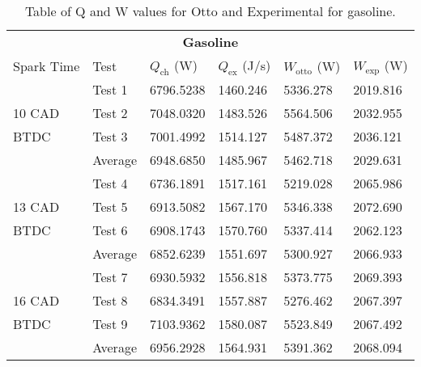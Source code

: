 \begin{table}[H]
    \begin{center}
        \begin{tabular}{@{}l l l l l l@{}}
            \toprule
            \multicolumn{6}{c}{\textbf{Gasoline}}                                                                             \\
            Spark Time & Test    & $Q_\textrm{ch}$ (W) & $Q_\textrm{ex}$ (J/s) & $W_\textrm{otto}$ (W) & $W_\textrm{exp}$ (W) \\
            \midrule
                       & Test 1  & 6796.5238           & 1460.246              & 5336.278              & 2019.816             \\
            10 CAD     & Test 2  & 7048.0320           & 1483.526              & 5564.506              & 2032.955             \\
            BTDC       & Test 3  & 7001.4992           & 1514.127              & 5487.372              & 2036.121             \\
                       & Average & 6948.6850           & 1485.967              & 5462.718              & 2029.631             \\
                       & Test 4  & 6736.1891           & 1517.161              & 5219.028              & 2065.986             \\
            13 CAD     & Test 5  & 6913.5082           & 1567.170              & 5346.338              & 2072.690             \\
            BTDC       & Test 6  & 6908.1743           & 1570.760              & 5337.414              & 2062.123             \\
                       & Average & 6852.6239           & 1551.697              & 5300.927              & 2066.933             \\
                       & Test 7  & 6930.5932           & 1556.818              & 5373.775              & 2069.393             \\
            16 CAD     & Test 8  & 6834.3491           & 1557.887              & 5276.462              & 2067.397             \\
            BTDC       & Test 9  & 7103.9362           & 1580.087              & 5523.849              & 2067.492             \\
                       & Average & 6956.2928           & 1564.931              & 5391.362              & 2068.094             \\
            \bottomrule
        \end{tabular}
        \caption{Table of Q and W values for Otto and Experimental for gasoline.}
        \label{q4-t4}
    \end{center}
\end{table}
